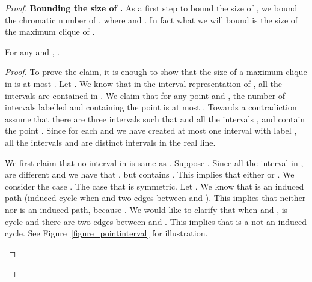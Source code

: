 \begin{proof}
\medskip
\noindent 
{\bf Bounding the size of .} As a first step to bound the size of , we bound the chromatic number of , where  and 
. In fact what we will bound is the size of the maximum clique of . 
\begin{claim}
\label{claim:CPpw}
For any  and , . 
\end{claim}
\begin{proof}
To prove the claim, it is enough to show that the size of a maximum clique in  is at most . 
Let . We know that in the interval representation of ,  
all the intervals are contained in . We claim that for any point  and ,  
the number of intervals labelled  and containing the point  is at most . Towards a contradiction assume that there are 
three intervals  such that  and all the 
intervals ,  and  contain the point . Since for each  and  
we have created at most one interval  with label , all the intervals  and  are distinct intervals in the real line. 

We first claim that no interval in  is same as . Suppose . 
Since all the interval in , are different and  we have that 
, but contains . This implies that either  or . We consider 
the case . The case that   is symmetric. 
Let . 
We know that  is an induced 
path (induced cycle when  and two edges between  and ). This 
implies that neither  nor  is an induced path, 
because . We would like to clarify that  
when  and ,  is cycle 
and there are two edges between  and . 
This implies that  is a not an induced cycle.
 See Figure~\ref{figure_pointinterval} for illustration.  



\begin{figure}
\begin{subfigure}[b]{0.5\textwidth}
        \centering

\end{subfigure}
\end{figure}
\end{proof}
\end{proof}
